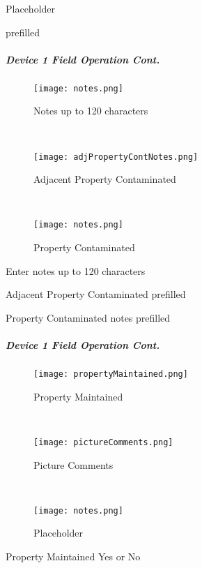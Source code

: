 \noindent Placeholder
\vspace{2.5in}

\noindent prefilled
\clearpage
\subparagraph*{Device 1 Field Operation Cont.}
\begin{wrapfigure}{r}{0.4\textwidth}
\centering
    \texttt{[image: notes.png]}
\caption {Notes up to 120 characters}
\vspace{.05in}

\HRule \\[.4cm] %
\vspace{.05in}

    \texttt{[image: adjPropertyContNotes.png]}
\caption{Adjacent Property Contaminated}
\vspace{.05in}

\HRule \\[.4cm] %
\vspace{.05in}

    \texttt{[image: notes.png]}
\caption{Property Contaminated}
\end{wrapfigure}
Enter notes up to 120 characters
\vspace{2in}

\noindent Adjacent Property Contaminated prefilled
\vspace{2in}

\noindent Property Contaminated notes prefilled
\clearpage
\subparagraph*{Device 1 Field Operation Cont.}
\begin{wrapfigure}{r}{0.4\textwidth}
\centering
    \texttt{[image: propertyMaintained.png]}
\caption {Property Maintained}
\vspace{.1in}

\HRule \\[.4cm] %
\vspace{.1in}

    \texttt{[image: pictureComments.png]}
\caption{Picture Comments}
\vspace{.1in}

\HRule \\[.4cm] %
\vspace{.1in}

    \texttt{[image: notes.png]}
\caption{Placeholder}
\end{wrapfigure}
Property Maintained Yes or No
\vspace{2.5in}

